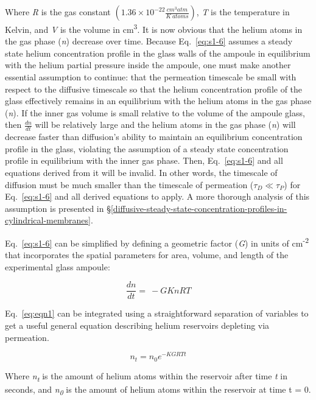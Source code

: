Where \emph{R} is the gas constant
\(\left( 1.36 \times 10^{- 22}\frac{cm^{3}atm}{K\ atoms} \right)\),
\emph{T} is the temperature in Kelvin, and \emph{V} is the volume in
cm\textsuperscript{3}. It is now obvious that the helium atoms in the
gas phase (\emph{n}) decrease over time. Because Eq.~\eqref{eq:s1-6} assumes a
steady state helium concentration profile in the glass walls of the
ampoule in equilibrium with the helium partial pressure inside the
ampoule, one must make another essential assumption to continue: that
the permeation timescale be small with respect to the diffusive
timescale so that the helium concentration profile of the glass
effectively remains in an equilibrium with the helium atoms in the gas
phase (\emph{n}). If the inner gas volume is small relative to the
volume of the ampoule glass, then \(\frac{dn}{dt}\) will be relatively
large and the helium atoms in the gas phase (\emph{n}) will decrease
faster than diffusion's ability to maintain an equilibrium concentration
profile in the glass, violating the assumption of a steady state
concentration profile in equilibrium with the inner gas phase. Then,
Eq.~\eqref{eq:s1-6} and all equations derived from it will be invalid. In other words, the
timescale of diffusion must be much smaller than the timescale of
permeation (\(\tau_{D} \ll \tau_{P}\)) for Eq.~\eqref{eq:s1-6} and all derived
equations to apply. A more thorough analysis of this assumption is
presented in \S\ref{diffusive-steady-state-concentration-profiles-in-cylindrical-membranes}.

Eq.~\eqref{eq:s1-6} can be simplified by defining a geometric factor (\emph{G}) in
units of cm\textsuperscript{-2} that incorporates the spatial parameters
for area, volume, and length of the experimental glass ampoule:

\begin{equation}
\frac{dn}{dt} = \  - GKnRT
\label{eq:eqn1}
\end{equation}

Eq.~\eqref{eq:eqn1} can be integrated using a straightforward separation of variables
to get a useful general equation describing helium reservoirs depleting
via permeation.

\begin{equation}
n_{t} = n_{0}e^{- KGRTt}
\label{eq:eqn2}
\end{equation}

Where \emph{n\textsubscript{t}} is the amount of helium atoms within the
reservoir after time \emph{t} in seconds, and \emph{n\textsubscript{0}}
is the amount of helium atoms within the reservoir at time t = 0.

